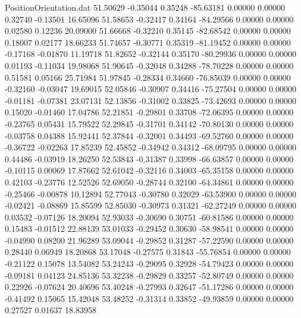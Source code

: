 \begin{filecontents}{PositionOrientation.dat}
  51.50629   -0.35044    0.35248   -85.63181    0.00000    0.00000    0.32740   -0.13501   16.65096
  51.58653   -0.32417    0.34164   -84.29566    0.00000    0.00000    0.02580    0.12236   20.09000
  51.66668   -0.32210    0.35145   -82.68542    0.00000    0.00000    0.18007    0.02177   18.66233
  51.74657   -0.30771    0.35319   -81.19452    0.00000    0.00000   -0.17168   -0.01870   11.19718
  51.82652   -0.32144    0.35170   -80.29936    0.00000    0.00000    0.01193   -0.11034   19.98068
  51.90645   -0.32048    0.34288   -78.70228    0.00000    0.00000    0.51581    0.05166   25.71984
  51.97845   -0.28334    0.34660   -76.85039    0.00000    0.00000   -0.32160   -0.03047   19.69015
  52.05846   -0.30907    0.34416   -75.27504    0.00000    0.00000   -0.01181   -0.07381   23.07131
  52.13856   -0.31002    0.33825   -73.42693    0.00000    0.00000    0.15020   -0.01460   17.04786
  52.21851   -0.29801    0.33708   -72.06395    0.00000    0.00000   -0.23765    0.05431   15.79522
  52.29845   -0.31701    0.34142   -70.80130    0.00000    0.00000   -0.03758    0.04388   15.92441
  52.37844   -0.32001    0.34493   -69.52760    0.00000    0.00000   -0.36722   -0.02263   17.85239
  52.45852   -0.34942    0.34312   -68.09795    0.00000    0.00000    0.44486   -0.03919   18.26250
  52.53843   -0.31387    0.33998   -66.63857    0.00000    0.00000   -0.10115    0.00069   17.87662
  52.61042   -0.32116    0.34003   -65.35158    0.00000    0.00000    0.42103   -0.23776   12.52526
  52.69050   -0.28744    0.32100   -64.34861    0.00000    0.00000   -0.25466   -0.00878   10.12894
  52.77043   -0.30780    0.32029   -63.53900    0.00000    0.00000   -0.02421   -0.08869   15.85599
  52.85030   -0.30973    0.31321   -62.27249    0.00000    0.00000    0.03532   -0.07126   18.20094
  52.93033   -0.30690    0.30751   -60.81586    0.00000    0.00000    0.15483   -0.01512   22.88139
  53.01033   -0.29452    0.30630   -58.98541    0.00000    0.00000   -0.04990    0.08200   21.96289
  53.09044   -0.29852    0.31287   -57.22590    0.00000    0.00000    0.28440    0.06949   18.20868
  53.17048   -0.27575    0.31843   -55.76854    0.00000    0.00000   -0.21122    0.15078   13.54082
  53.24243   -0.29095    0.32928   -54.79423    0.00000    0.00000   -0.09181    0.04123   24.85136
  53.32238   -0.29829    0.33257   -52.80749    0.00000    0.00000    0.22926   -0.07624   20.40696
  53.40248   -0.27993    0.32647   -51.17286    0.00000    0.00000   -0.41492    0.15065   15.42048
  53.48252   -0.31314    0.33852   -49.93859    0.00000    0.00000    0.27527    0.01637   18.83958

\end{filecontents}
